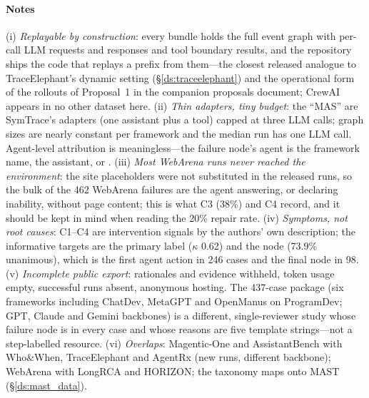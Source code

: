 \paragraph{Notes} (i) \emph{Replayable by construction}: every bundle holds the full event graph with per-call LLM requests and responses and tool boundary results, and the repository ships the code that replays a prefix from them---the closest released analogue to TraceElephant's dynamic setting (\S\ref{ds:traceelephant}) and the operational form of the rollouts of Proposal~1 in the companion proposals document; CrewAI appears in no other dataset here. (ii) \emph{Thin adapters, tiny budget}: the ``MAS'' are SymTrace's  adapters (one assistant plus a  tool) capped at three LLM calls; graph sizes are nearly constant per framework and the median run has one LLM call. Agent-level attribution is meaningless---the failure node's agent is the framework name, the assistant,  or . (iii) \emph{Most WebArena runs never reached the environment}: the site placeholders were not substituted in the released runs, so the bulk of the 462 WebArena failures are the agent answering, or declaring inability, without page content; this is what C3 (38\%) and C4 record, and it should be kept in mind when reading the 20\% repair rate. (iv) \emph{Symptoms, not root causes}: C1--C4 are intervention signals by the authors' own description; the informative targets are the primary label ($\kappa$ 0.62) and the node (73.9\% unanimous), which is the first agent action in 246 cases and the final node in 98. (v) \emph{Incomplete public export}: rationales and evidence withheld, token usage empty, successful runs absent, anonymous hosting. The 437-case package (six frameworks including ChatDev, MetaGPT and OpenManus on ProgramDev; GPT, Claude and Gemini backbones) is a different, single-reviewer study whose failure node is  in every case and whose reasons are five template strings---not a step-labelled resource. (vi) \emph{Overlaps}: Magentic-One and AssistantBench with Who\&When, TraceElephant and AgentRx (new runs, different backbone); WebArena with LongRCA and HORIZON; the taxonomy maps onto MAST (\S\ref{ds:mast_data}).
